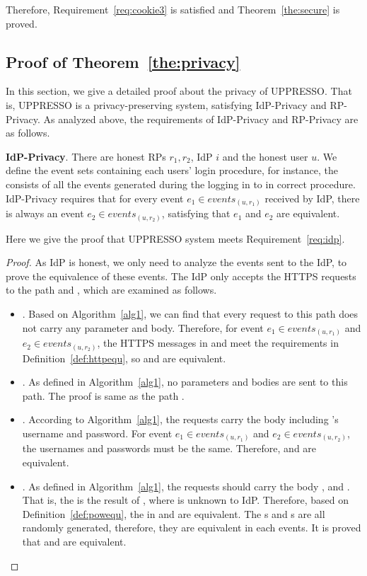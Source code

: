 \begin{appendices}
Therefore, Requirement~\ref{req:cookie3} is satisfied and Theorem~\ref{the:secure} is proved.

\subsection{Proof of Theorem~\ref{the:privacy}}
In this section, we give a detailed proof about the privacy of UPPRESSO. That is,  UPPRESSO is a privacy-preserving system, satisfying IdP-Privacy and RP-Privacy. As analyzed above,  the requirements of IdP-Privacy and RP-Privacy are as follows. 
\begin{req}
\textbf{IdP-Privacy}. There are honest RPs $r_1, r_2$, IdP $i$ and the honest user $u$. We define the event sets containing each users' login procedure, for instance, the  consists of all the events generated during the  logging in to  in correct procedure. IdP-Privacy requires that for every event $e_1 \in events_{(u, r_1)}$ received by IdP, there is always an  event $e_2 \in events_{(u, r_2)}$, satisfying that $e_1$ and $e_2$ are equivalent.
\label{req:idp}
\end{req}
Here we give the proof that UPPRESSO system meets Requirement~\ref{req:idp}.
\begin{proof}
As IdP is honest, we only need to analyze the events sent to the IdP, to prove the equivalence of these events. The IdP only accepts the HTTPS requests to the path  and , which are examined  as follows.
\begin{itemize}
\item {}. Based on Algorithm~\ref{alg1}, we can find that every request to this path does not carry any parameter and body. Therefore, for event $e_1 \in events_{(u, r_1)}$ and $e_2 \in events_{(u, r_2)}$, the HTTPS messages in  and  meet the requirements in Definition~\ref{def:httpequ}, so  and  are equivalent.
\item {}. As defined in Algorithm~\ref{alg1}, no parameters and bodies are sent to this path. The proof is same as the path .
\item {}. According to Algorithm~\ref{alg1}, the requests carry the body including 's username and password. For event $e_1 \in events_{(u, r_1)}$ and $e_2 \in events_{(u, r_2)}$, the usernames and passwords must be the same. Therefore,  and  are equivalent.
\item {}. As defined in Algorithm~\ref{alg1}, the requests should carry the body ,  and . That is, the  is the result of , where  is unknown to IdP. Therefore,  based on Definition~\ref{def:powequ}, the  in  and  are equivalent. The s and s are all randomly generated, therefore, they are equivalent in each events. It is proved that  and  are equivalent.

\end{itemize}
\end{proof}
\end{appendices}
